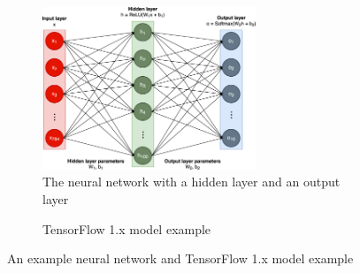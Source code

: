 \begin{figure}\centering
    \begin{subfigure}[b]{1\textwidth}
        \centering
        \includegraphics[width=0.7\textwidth]{Fig1.eps}
        \caption{The neural network with a hidden layer and an output layer}
        \label{fig:back:model}
    \end{subfigure}
    
    \begin{subfigure}[b]{1\textwidth}
        
        \caption{TensorFlow 1.x model example}
        \label{fig:back:tf1}
    \end{subfigure}   
    \caption{An example neural network and TensorFlow 1.x model example}
    \label{fig:back:tf1_all}
\end{figure}


